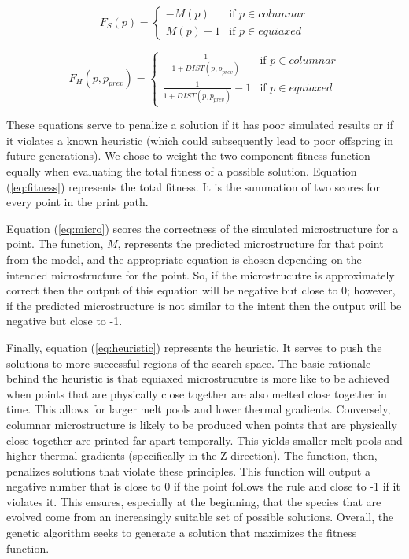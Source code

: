 \documentclass[a4paper]{article}
\begin{document}
\begin{equation}
\label{eq:micro}
F_{S}(p) = \begin{cases} 
            -M(p) & \text{if $p \in columnar$} \\
            M(p) - 1 & \text{if $p \in equiaxed$}
            \end{cases}
\end{equation}

\begin{equation}
\label{eq:heuristic}
F_{H}(p, p_{prev}) = \begin{cases} 
                        -\frac{1}{1 + DIST(p, p_{prev})}  & \text{if $p \in columnar$} \\
                        \frac{1}{1 + DIST(p, p_{prev})} - 1 & \text{if $p \in equiaxed$}
                        \end{cases}
\end{equation}

These equations serve to penalize a solution if it has poor simulated results or if it violates a known heuristic (which could subsequently lead to poor offspring in future generations). We chose to weight the two component fitness function equally when evaluating the total fitness of a possible solution. Equation (\ref{eq:fitness}) represents the total fitness. It is the summation of two scores for every point in the print path. 

Equation (\ref{eq:micro}) scores the correctness of the simulated microstructure for a point. The function, $M$, represents the predicted microstructure for that point from the model, and the appropriate equation is chosen depending on the intended microstructure for the point. So, if the microstrucutre is approximately correct then the output of this equation will be negative but close to 0; however, if the predicted microstructure is not similar to the intent then the output will be negative but close to -1.

Finally, equation (\ref{eq:heuristic}) represents the heuristic. It serves to push the solutions to more successful regions of the search space. The basic rationale behind the heuristic is that equiaxed microstrucutre is more like to be achieved when points that are physically close together are also melted close together in time. This allows for larger melt pools and lower thermal gradients. Conversely, columnar microstructure is likely to be produced when points that are physically close together are printed far apart temporally. This yields smaller melt pools and higher thermal gradients (specifically in the Z direction). The function, then, penalizes solutions that violate these principles. This function will output a negative number that is close to 0 if the point follows the rule and close to -1 if it violates it. This ensures, especially at the beginning, that the species that are evolved come from an increasingly suitable set of possible solutions. Overall, the genetic algorithm seeks to generate a solution that maximizes the fitness function.
\end{document}
